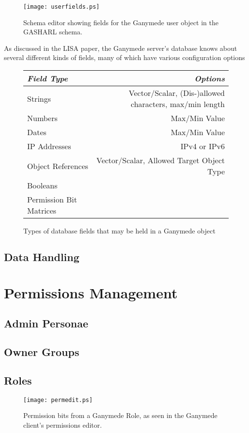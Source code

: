 \documentclass{book}
\begin{document}
\begin{center}
\begin{figure}
	\texttt{[image: userfields.ps]}
	\caption{Schema editor showing fields for the Ganymede user
object in the GASHARL schema.}\label{userfields}
\end{figure}
\end{center}

As discussed in the LISA paper, the Ganymede server's database knows
about several different kinds of fields, many of which have various
configuration options

\begin{center}
\begin{figure}
\begin{tabular}{|l|r|} \hline
\emph{Field Type} & \emph{Options} \\ \hline
Strings & Vector/Scalar, (Dis-)allowed characters, max/min length\\
Numbers & Max/Min Value \\
Dates & Max/Min Value \\
IP Addresses & IPv4 or IPv6\\
Object References & Vector/Scalar, Allowed Target Object Type\\
Booleans & \\
Permission Bit Matrices & \\ \hline
\end{tabular}
\caption{Types of database fields that may be held in a Ganymede
object}\label{fg:fieldtypes}
\end{figure}
\end{center}

\section{Data Handling}

\chapter{Permissions Management}\label{Perms}
\section{Admin Personae}
\section{Owner Groups}
\section{Roles}
\begin{figure}
	\texttt{[image: permedit.ps]}
	\caption{Permission bits from a Ganymede Role, as seen in the
		 Ganymede client's permissions editor.}\label{rolefig}
\end{figure}
\label{Roles}
\end{document}
